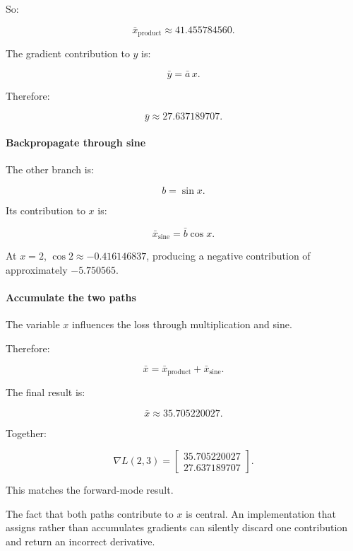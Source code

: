 So:

\[
\bar x_{\text{product}} \approx41.455784560.
\]

The gradient contribution to \(y\) is:

\[
\bar y=\bar a\,x.
\]

Therefore:

\[
\boxed{\bar y\approx27.637189707}.
\]

\paragraph{Backpropagate through sine}\label{02-foundations-ii-ch022-backpropagate-through-sine}

\hypertarget{02-foundations-ii-ch022-backpropagate-through-sine}{}

The other branch is:

\[
b=\sin x.
\]

Its contribution to \(x\) is:

\[
\bar x_{\text{sine}} = \bar b\cos x.
\]

At \(x=2\), \(\cos2\approx-0.416146837\), producing a negative contribution of approximately \(-5.750565\).

\paragraph{Accumulate the two paths}\label{02-foundations-ii-ch022-accumulate-the-two-paths}

\hypertarget{02-foundations-ii-ch022-accumulate-the-two-paths}{}

The variable \(x\) influences the loss through multiplication and sine.

Therefore:

\[
\bar x = \bar x_{\text{product}} + \bar x_{\text{sine}}.
\]

The final result is:

\[
\boxed{\bar x\approx35.705220027}.
\]

Together:

\[
\boxed{ \nabla L(2,3)= \begin{bmatrix} 35.705220027\\ 27.637189707 \end{bmatrix} }.
\]

This matches the forward-mode result.

The fact that both paths contribute to \(x\) is central. An implementation that assigns rather than accumulates gradients can silently discard one contribution and return an incorrect derivative.


